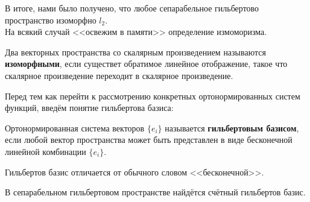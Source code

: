 \documentclass[12pt]{article}
\begin{document}
	В итоге, нами было получено, что любое сепарабельное гильбертово пространство изоморфно $l_2$. \\
	На всякий случай <<освежим в памяти>> определение измоморизма.
	\begin{defi}
		Два векторных пространства со скалярным произведением называются 
		\textbf{изоморфными}, если существет обратимое линейное отображение, 
		такое что скалярное произведение переходит в скалярное произведение.
	\end{defi}
	
	Перед тем как перейти к рассмотрению конкретных ортонормированных систем функций, введём понятие гильбертова базиса:
	\begin{defi}
		Ортонормированная система векторов $\{ e_i \}$ называется \textbf{гильбертовым базисом}, если любой вектор
		пространства может быть представлен в виде бесконечной линейной комбинации $ \{ e_i \} $.
	\end{defi}
	
	{\color{gray} Гильбертов базис отличается от обычного словом <<бесконечной>>.}
	
	\begin{state}
		В сепарабельном гильбертовом пространстве найдётся счётный гильбертов базис.
	\end{state}
	
\end{document}
